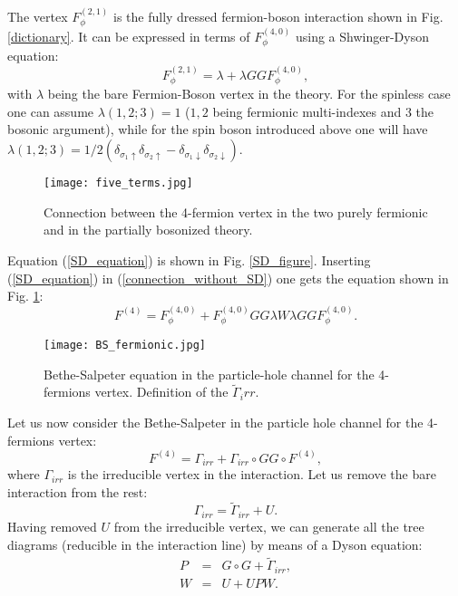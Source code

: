 \documentclass[a4paper,11pt]{article}
\begin{document}
The vertex $F_\phi^{(2,1)}$ is the fully dressed fermion-boson interaction shown in Fig. \ref{dictionary}. It can be expressed in terms of $F_\phi^{(4,0)}$ using a Shwinger-Dyson equation\cite{Schuetz2004}: 
\begin{equation}
\label{SD_equation}
F_\phi^{(2,1)} = \lambda + \lambda G G F_\phi^{(4,0)},   
\end{equation}
with $\lambda$ being the bare Fermion-Boson vertex in the theory. For the spinless case one can assume $\lambda(1,2;3)=1$ ($1,2$ being fermionic multi-indexes and $3$ the bosonic argument), while for the spin boson introduced above one will have $\lambda (1,2;3)=1/2( \delta_{\sigma_1\uparrow}\delta_{\sigma_2\uparrow}-\delta_{\sigma_1\downarrow}
\delta_{\sigma_2\downarrow})$. 
\begin{figure}
\texttt{[image: five\_terms.jpg]}
\label{five_terms}
\caption{Connection between the 4-fermion vertex in the two purely fermionic and in the partially bosonized theory. } 
\end{figure}
Equation (\ref{SD_equation}) is shown in Fig. \ref{SD_figure}. 
Inserting (\ref{SD_equation}) in (\ref{connection_without_SD}) one gets the equation shown in Fig. \ref{five_terms}:
\begin{equation}
\label{five_terms_eq} 
F^{(4)} = F_\phi^{(4,0)} + F_\phi^{(4,0)} G G  \lambda W \lambda G G F_\phi^{(4,0)}.  
\end{equation}
\begin{figure}
\texttt{[image: BS\_fermionic.jpg]}
\label{BS_fermionic}
\caption{Bethe-Salpeter equation in the particle-hole channel for the 4-fermions vertex. 
Definition of the $\tilde \Gamma_irr$. } 
\end{figure}
Let us now consider the Bethe-Salpeter in the particle hole channel for the 4-fermions vertex: 
\begin{equation}
\label{BS_fermionic_eq} 
F^{(4)} = \Gamma_{irr} + \Gamma_{irr} \circ GG \circ F^{(4)},  
\end{equation}  
where $\Gamma_{irr}$ is the irreducible vertex in the interaction. Let us remove the bare interaction from the rest: 
\begin{equation}
\label{removing_U}
\Gamma_{irr}= \tilde \Gamma_{irr}+U. 
\end{equation} 
Having removed $U$ from the irreducible vertex, we can generate all the tree diagrams (reducible in the interaction line) by means of a Dyson equation: 
\begin{eqnarray}
P& =& G\circ G + \tilde \Gamma_{irr}, \\
W & = & U + U P W  . 
\end{eqnarray}  
\end{document}
